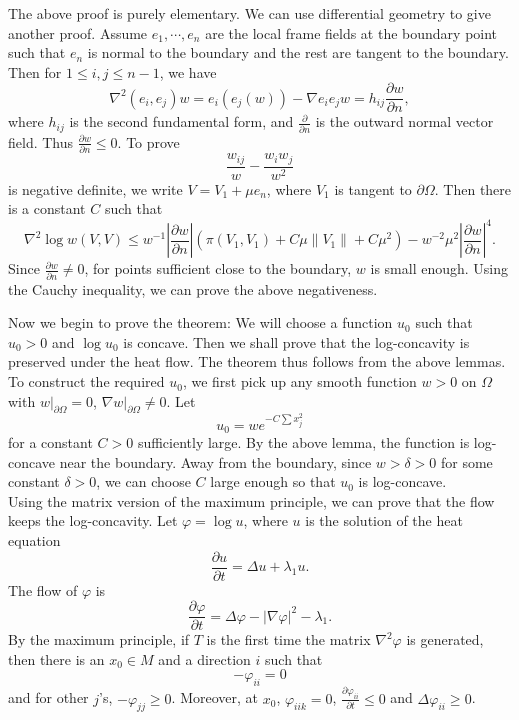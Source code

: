 \begin{remark}
The above proof is purely elementary. We can use differential geometry to give
another proof. Assume $e_1, \cdots, e_n$ are the local frame fields at the
boundary point such that $e_n$ is normal to the boundary and the rest are
tangent to the boundary. Then for $1\leqslant i, j \leqslant n-1$, we have
\[
\nabla^2 (e_i,e_j) w = e_i(e_j(w)) - \nabla e_i e_j w = h_{ij} 
\frac{\partial w}{\partial n},
\]
where $h_{ij}$ is the second fundamental form, and $\frac{\partial}{\partial n}$
is the outward normal vector field. Thus 
$\frac{\partial w}{\partial n} \leqslant 0$. To prove
\[
\frac{w_{ij}}{w} - \frac{w_i w_j}{w^2}
\]
is negative definite, we write $V=V_1 + \mu e_n$, where $V_1$ is tangent to
$\partial\Omega$. Then there is a constant $C$ such that
\[
\nabla^2 \log w(V,V) \leqslant w^{-1}\left|\frac{\partial w}{\partial n}\right|
(\pi(V_1, V_1) + C \mu \|V_1\| +C \mu^2) - 
w^{-2} \mu^2 \left|\frac{\partial w}{\partial n}\right|^4.
\]
Since $\frac{\partial w}{\partial n} \neq 0$, for points sufficient close to the
boundary, $w$ is small enough. Using the Cauchy inequality, we can prove the
above negativeness.
\end{remark}

Now we begin to prove the theorem: We will choose a function $u_0$ such that
$u_0 > 0$ and $\log u_0$ is concave. Then we shall prove that the log-concavity
is preserved under the heat flow. The theorem thus follows from the above
lemmas.
\\

To construct the required $u_0$, we first pick up any smooth function $w>0$ on
$\Omega$ with $w|_{\partial\Omega} = 0$, $\nabla w|_{\partial \Omega} \neq 0$.
Let
\[
u_0 = w e^{-C\sum x_j^2}
\]
for a constant $C > 0$ sufficiently large. By the above lemma, the function is 
log-concave near the boundary. Away from the boundary, since $w > \delta > 0$
for some constant $\delta > 0$, we can choose $C$ large enough so that $u_0$ is
log-concave.
\\

Using the matrix version of the maximum principle, we can prove that the flow
keeps the log-concavity. Let $\varphi = \log u$, where $u$ is the solution of
the heat equation
\[
\frac{\partial u}{\partial t} = \Delta u + \lambda_1 u.
\]
The flow of $\varphi$ is
\begin{equation}\label{2-1-2}
\frac{\partial\varphi}{\partial t} = \Delta\varphi - |\nabla\varphi|^2 - 
\lambda_1.
\end{equation}
By the maximum principle, if $T$ is the first time the matrix $\nabla^2\varphi$
is generated, then there is an $x_0\in M$ and a direction $i$ such that
\[
-\varphi_{ii} = 0
\]
and for other $j$'s, $-\varphi_{jj} \geqslant 0$. Moreover, at $x_0$,
$\varphi_{iik} = 0$, $\frac{\partial\varphi_{ii}}{\partial t} \leqslant 0$ and
$\Delta\varphi_{ii} \geqslant 0$.
\\

